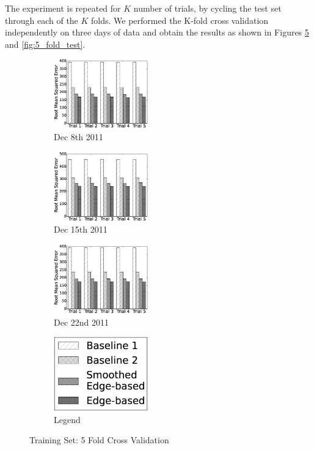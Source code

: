\documentclass[draft]{sig-alternate}
\begin{document}
The experiment is repeated for $K$ number of trials, by cycling the test set through each of the $K$ folds. We performed the K-fold cross validation independently on three days of data and obtain the results as shown in Figures \ref{fig:5_fold_train} and \ref{fig:5_fold_test}. 
\begin{figure}[htb]
	\centering
	\begin{subfigure}{1.6in}
		\includegraphics[width=1.6in]{20111208_train} %
		\caption{Dec 8th 2011}
		\label{fig:20111208_train}
	\end{subfigure}
	\begin{subfigure}{1.6in}
		\includegraphics[width=1.6in]{20111215_train} %
		\caption{Dec 15th 2011}
		\label{fig:20111215_train}
	\end{subfigure}
	\begin{subfigure}{1.6in}
		\includegraphics[width=1.6in]{20111222_train} %
		\caption{Dec 22nd 2011}
		\label{fig:20111222_train}
	\end{subfigure}
	\begin{subfigure}{1.6in}
		\includegraphics[width=1.6in]{legend} %
		\caption{Legend}
		\label{fig:legend_train}
	\end{subfigure}
	\caption{Training Set: 5 Fold Cross Validation}
	\label{fig:5_fold_train}
\end{figure}
\end{document}
